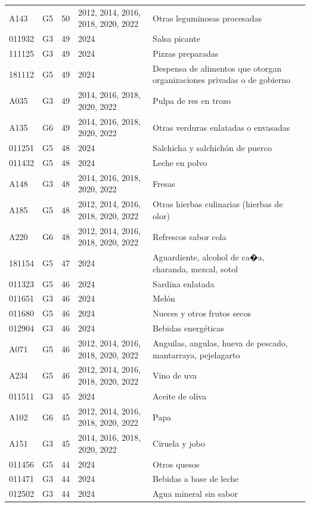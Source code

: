 \begin{table}[ht]
\begin{tabular}{llrll}
  A143 & G5 &  50 & 2012, 2014, 2016, 2018, 2020, 2022 & Otras leguminosas procesadas \\ 
  011932 & G3 &  49 & 2024 & Salsa picante \\ 
  111125 & G3 &  49 & 2024 & Pizzas preparadas \\ 
  181112 & G5 &  49 & 2024 & Despensa de alimentos que otorgan organizaciones privadas o de gobierno \\ 
  A035 & G3 &  49 & 2014, 2016, 2018, 2020, 2022 & Pulpa de res en trozo \\ 
  A135 & G6 &  49 & 2014, 2016, 2018, 2020, 2022 & Otras verduras enlatadas o envasadas \\ 
  011251 & G5 &  48 & 2024 & Salchicha y salchichón de puerco \\ 
  011432 & G5 &  48 & 2024 & Leche en polvo \\ 
  A148 & G3 &  48 & 2014, 2016, 2018, 2020, 2022 & Fresas \\ 
  A185 & G5 &  48 & 2012, 2014, 2016, 2018, 2020, 2022 & Otras hierbas culinarias (hierbas de olor) \\ 
  A220 & G6 &  48 & 2012, 2014, 2016, 2018, 2020, 2022 & Refrescos sabor cola \\ 
  181154 & G5 &  47 & 2024 & Aguardiente, alcohol de ca�a, charanda, mezcal, sotol \\ 
  011323 & G5 &  46 & 2024 & Sardina enlatada \\ 
  011651 & G3 &  46 & 2024 & Melón \\ 
  011680 & G5 &  46 & 2024 & Nueces y otros frutos secos \\ 
  012904 & G3 &  46 & 2024 & Bebidas energéticas \\ 
  A071 & G5 &  46 & 2012, 2014, 2016, 2018, 2020, 2022 & Anguilas, angulas, hueva de pescado, mantarraya, pejelagarto \\ 
  A234 & G5 &  46 & 2012, 2014, 2016, 2018, 2020, 2022 & Vino de uva \\ 
  011511 & G3 &  45 & 2024 & Aceite de oliva \\ 
  A102 & G6 &  45 & 2012, 2014, 2016, 2018, 2020, 2022 & Papa \\ 
  A151 & G3 &  45 & 2014, 2016, 2018, 2020, 2022 & Ciruela y jobo \\ 
  011456 & G5 &  44 & 2024 & Otros quesos \\ 
  011471 & G3 &  44 & 2024 & Bebidas a base de leche \\ 
  012502 & G3 &  44 & 2024 & Agua mineral sin sabor \\ 

\end{tabular}
\end{table}
